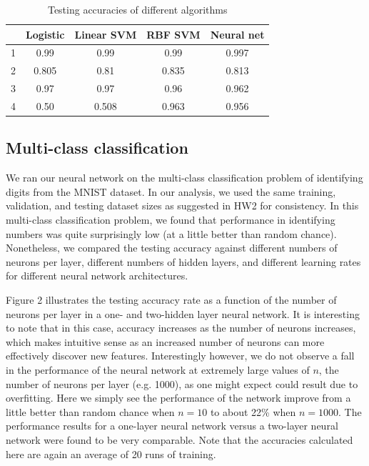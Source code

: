 \documentclass{article}
\begin{document}
\begin{table}
  \begin{center}
    \begin{tabular}{ | c | c | c | c | c | }
      \hline
          & Logistic   & Linear SVM   & RBF SVM    & Neural net \\ \hline
      1   & 0.99       & 0.99         & 0.99       & 0.997        \\ \hline
      2   & 0.805      & 0.81         & 0.835      & 0.813        \\ \hline
      3   & 0.97       & 0.97         & 0.96       & 0.962        \\ \hline
      4   & 0.50       & 0.508        & 0.963      & 0.956        \\ \hline
    \end{tabular}
  \end{center}
  \caption{Testing accuracies of different algorithms}
\end{table}

\subsection{Multi-class classification}
We ran our neural network on the multi-class classification problem of identifying digits from the MNIST dataset. In our analysis, we used the same training, validation, and testing dataset sizes as suggested in HW2 for consistency. In this multi-class classification problem, we found that performance in identifying numbers was quite surprisingly low (at a little better than random chance). Nonetheless, we compared the testing accuracy against different numbers of neurons per layer, different numbers of hidden layers, and different learning rates for different neural network architectures.

Figure 2 illustrates the testing accuracy rate as a function of the number of neurons per layer in a one- and two-hidden layer neural network. It is interesting to note that in this case, accuracy increases as the number of neurons increases, which makes intuitive sense as an increased number of neurons can more effectively discover new features. Interestingly however, we do not observe a fall in the performance of the neural network at extremely large values of $n$, the number of neurons per layer (e.g. 1000), as one might expect could result due to overfitting. Here we simply see the performance of the network improve from a little better than random chance when $n=10$ to about 22\% when $n=1000$. The performance results for a one-layer neural network versus a two-layer neural network were found to be very comparable. Note that the accuracies calculated here are again an average of 20 runs of training.
\end{document}
